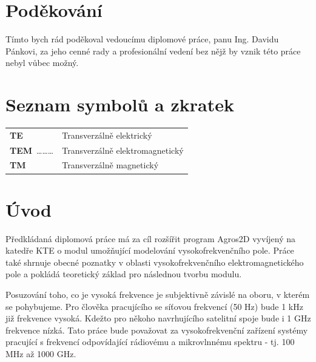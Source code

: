 \documentclass[12pt,a4paper,oneside]{article}
\numberwithin{equation}{section} %
\numberwithin{figure}{section} %
\numberwithin{table}{section} %
\begin{document}
\vspace*{50mm}
\section*{Poděkování}
Tímto bych rád poděkoval vedoucímu diplomové práce, panu Ing. Davidu Pánkovi, za 			jeho cenné rady a profesionální vedení bez nějž by vznik této práce nebyl vůbec 			možný.\\
\newpage


\cfoot{-~\thepage ~-}
\pagestyle{fancy}
\setcounter{page}{1}


\setlength{\parskip}{0ex} %
\tableofcontents
\newpage


\section*{Seznam symbolů a zkratek}

\begin{tabular}{ll}
\textbf{TE}\dotfill & Transverzálně elektrický \\  
\textbf{TEM}~\ldots\ldots\ldots & Transverzálně elektromagnetický \\ 
\textbf{TM}\dotfill & Transverzálně magnetický \\ 
\end{tabular} 
\newpage

\setlength{\parindent}{5ex} 
\setlength{\parskip}{1ex}


\section{Úvod}
Předkládaná diplomová práce má za cíl rozšířit program Agros2D  vyvíjený na katedře KTE o modul umožňující modelování vysokofrekvenčního pole. Práce také shrnuje obecné poznatky v oblasti vysokofrekvenčního elektromagnetického pole a pokládá teoretický základ pro následnou tvorbu modulu.

Posuzování toho, co je vysoká frekvence je subjektivně závislé na oboru, v kterém se pohybujeme. Pro člověka pracujícího se síťovou frekvencí (50 Hz) bude 1 kHz již frekvence vysoká. Kdežto pro někoho navrhujícího satelitní spoje bude i 1 GHz frekvence nízká. Tato práce bude považovat za vysokofrekvenční zařízení systémy pracující s frekvencí odpovídající rádiovému a mikrovlnnému spektru - tj. 100 MHz až 1000 GHz. \cite{Pozar4}
\end{document}
